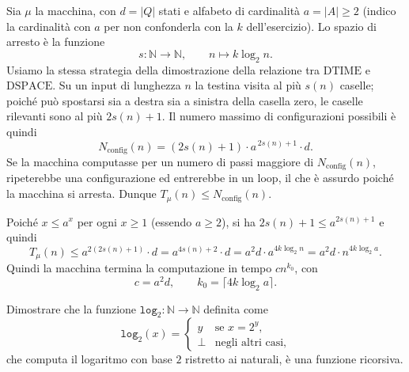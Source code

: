 \begin{sol}
Sia $\mu$ la macchina, con $d=|Q|$ stati e alfabeto di cardinalità $a=|A|\geq 2$ (indico la cardinalità con $a$ per non confonderla con la $k$ dell'esercizio). Lo spazio di arresto è la funzione
\[
s\colon \mathbb N\to\mathbb N,\qquad n\mapsto k\log_2 n .
\]
Usiamo la stessa strategia della dimostrazione della relazione tra $\mathrm{DTIME}$ e $\mathrm{DSPACE}$. Su un input di lunghezza $n$ la testina visita al più $s(n)$ caselle; poiché può spostarsi sia a destra sia a sinistra della casella zero, le caselle rilevanti sono al più $2s(n)+1$. Il numero massimo di configurazioni possibili è quindi
\[
N_{\mathrm{config}}(n)=(2s(n)+1)\cdot a^{\,2s(n)+1}\cdot d .
\]
Se la macchina computasse per un numero di passi maggiore di $N_{\mathrm{config}}(n)$, ripeterebbe una configurazione ed entrerebbe in un loop, il che è assurdo poiché la macchina si arresta. Dunque $T_\mu(n)\le N_{\mathrm{config}}(n)$.

Poiché $x\le a^{x}$ per ogni $x\ge 1$ (essendo $a\geq 2$), si ha $2s(n)+1\le a^{2s(n)+1}$ e quindi
\[
T_\mu(n)\le a^{2(2s(n)+1)}\cdot d=a^{4s(n)+2}\cdot d=a^{2}d\cdot a^{4k\log_2 n}=a^{2}d\cdot n^{4k\log_2 a}.
\]
Quindi la macchina termina la computazione in tempo $cn^{k_0}$, con
\[
c=a^{2}d,\qquad k_0=\lceil 4k\log_2 a\rceil .
\]
\end{sol}

\newpage

\begin{ex}

    \item Dimostrare che la funzione $\texttt{log}_2\colon\mathbb N\to\mathbb N$ definita come
    \[
    \texttt{log}_2(x)=\begin{cases} y & \text{se } x=2^{y},\\ \bot & \text{negli altri casi,}\end{cases}
    \]
    che computa il logaritmo con base $2$ ristretto ai naturali, è una funzione ricorsiva.

\end{ex}

